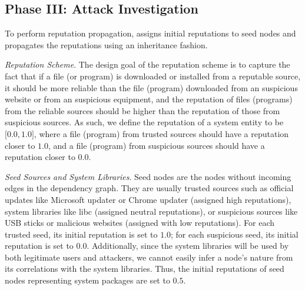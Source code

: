\subsection{Phase III: Attack Investigation}
\label{subsec:attack-investigation}



To perform reputation propagation, \tool assigns initial reputations to seed nodes and propagates the reputations using an inheritance fashion.

\emph{Reputation Scheme}.
The design goal of the reputation scheme is to capture the fact that if a file (or program) is downloaded or installed from a reputable source, it should be more reliable than the file (program) downloaded from an suspicious website or from an suspicious equipment, and the reputation of files (programs) from the reliable sources should be higher than the reputation of those from suspicious sources. As such, we define the reputation of a system entity to be $\lbrack 0.0,1.0 \rbrack$, where a file (program) from trusted sources should have a reputation closer to $1.0$, and a file (program) from suspicious sources should have a reputation closer to $0.0$. 


\emph{Seed Sources and System Libraries}.
Seed nodes are the nodes without incoming edges in the dependency graph. They are usually trusted sources such as official updates like Microsoft updater or Chrome updater (assigned high reputations), system libraries like libc (assigned neutral reputations), or suspicious sources like USB sticks or malicious websites (assigned with low reputations). For each trusted seed, its initial reputation is set to $1.0$; for each suspicious seed, its initial reputation is set to $0.0$. 
Additionally, since the system libraries will be used by both legitimate users and attackers, we cannot easily infer a node's nature from its correlations with the system libraries. Thus, the initial reputations of seed nodes representing system packages are set to $0.5$.

